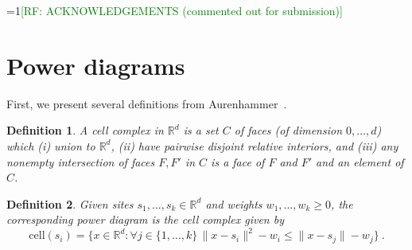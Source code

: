 \documentclass[12pt]{article}
\newcommand{\Comments}{1}
\newcommand{\mynote}[2]{\ifnum\Comments=1\textcolor{#1}{#2}\fi}
\newcommand{\raf}[1]{\mynote{green}{[RF: #1]}}
\newcommand{\reals}{\mathbb{R}}
\newcommand{\cell}{\mathrm{cell}}
\newtheorem{conjecture}{Conjecture}
\newtheorem{definition}{Definition}
\begin{document}



\raf{ACKNOWLEDGEMENTS (commented out for submission)}



\appendix

\newpage
\section{Power diagrams}
First, we present several definitions from Aurenhammer~\cite{aurenhammer1987power}.
\begin{definition}\label{def:cell-complex}
  A \emph{cell complex} in $\reals^d$ is a set $C$ of faces (of dimension $0,\ldots,d$) which (i) union to $\reals^d$, (ii) have pairwise disjoint relative interiors, and (iii) any nonempty intersection of faces $F,F'$ in $C$ is a face of $F$ and $F'$ and an element of $C$.
\end{definition}

\begin{definition}\label{def:power-diagram}
  Given sites $s_1,\ldots,s_k\in\reals^d$ and weights $w_1,\ldots,w_k \geq 0$, the corresponding \emph{power diagram} is the cell complex given by
  \begin{equation}
    \label{eq:pd}
    \cell(s_i) = \{ x \in\reals^d : \forall j \in \{1,\ldots,k\} \, \|x - s_i\|^2 - w_i \leq \|x - s_j\| - w_j\}~.
  \end{equation}
\end{definition}
\end{document}
